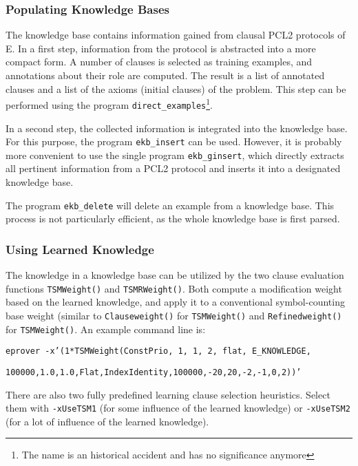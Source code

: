 \documentclass{report}
\begin{document}
\subsubsection{Populating Knowledge Bases}

The knowledge base contains information gained from clausal PCL2
protocols of E. In a first step, information from the protocol is
abstracted into a more compact form. A number of clauses is selected
as training examples, and annotations about their role are computed.
The result is a list of annotated clauses and a list of the axioms
(initial clauses) of the problem. This step can be performed using the
program \texttt{direct\_examples}\footnote{The name is an historical
  accident and has no significance anymore}.

In a second step, the collected information is integrated into the
knowledge base. For this purpose, the program \texttt{ekb\_insert}
can be used. However, it is probably more convenient to use the single
program \texttt{ekb\_ginsert}, which directly extracts all pertinent
information from a PCL2 protocol and inserts it into a designated
knowledge base.

The program \texttt{ekb\_delete} will delete an example from a
knowledge base. This process is not particularly efficient, as the
whole knowledge base is first parsed.


\subsubsection{Using Learned Knowledge}

The knowledge in a knowledge base can be utilized by the two clause
evaluation functions \texttt{TSMWeight()} and \texttt{TSMRWeight()}.
Both compute a modification weight based on the learned knowledge, and
apply it to a conventional symbol-counting base weight (similar to
\texttt{Clauseweight()} for \texttt{TSMWeight()} and
\texttt{Refinedweight()} for \texttt{TSMWeight()}. An example command
line is:

\texttt{eprover -x'(1*TSMWeight(ConstPrio, 1, 1, 2, flat,
  E\_KNOWLEDGE,}

\texttt{100000,1.0,1.0,Flat,IndexIdentity,100000,-20,20,-2,-1,0,2))'}

There are also two fully predefined learning clause selection
heuristics. Select them with \texttt{-xUseTSM1} (for some influence of
the learned knowledge) or \texttt{-xUseTSM2} (for a lot of influence
of the learned knowledge).
\end{document}

